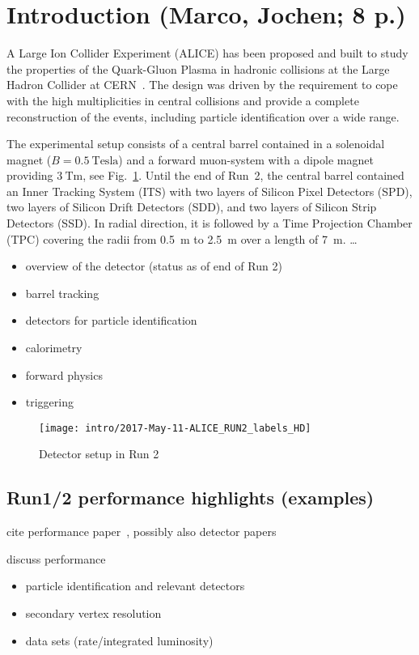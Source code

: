 \section{Introduction (Marco, Jochen; 8 p.)}

A Large Ion Collider Experiment (ALICE) has been proposed and built to study
the properties of the Quark-Gluon Plasma in hadronic collisions at the Large
Hadron Collider at CERN~\cite{Aamodt:2008zz}. The design was driven by the
requirement to cope with the high multiplicities in central \PbPb collisions
and provide a complete reconstruction of the events, including particle
identification over a wide \pt range.

The experimental setup consists of a central barrel contained in a solenoidal
magnet ($B = 0.5~\mathrm{Tesla}$) and a forward muon-system with a dipole magnet
providing $3~\mathrm{Tm}$, see Fig.~\ref{fig:alice_run2}. Until the end of Run~2,
the central barrel contained an Inner Tracking System (ITS) with two layers of
Silicon Pixel Detectors (SPD), two layers of Silicon Drift Detectors (SDD), and
two layers of Silicon Strip Detectors (SSD). In radial direction, it is followed
by a Time Projection Chamber (TPC) covering the radii from 0.5~m to 2.5~m over a
length of 7~m. \dots

\begin{itemize}
\item overview of the detector
  (status as of end of Run 2)
\item barrel tracking
\item detectors for particle identification
\item calorimetry
\item forward physics
\item triggering
\end{itemize}

\begin{figure}
\centering
\texttt{[image: intro/2017-May-11-ALICE\_RUN2\_labels\_HD]}
\caption{Detector setup in Run 2}
\label{fig:alice_run2}
\end{figure}

\subsection*{Run1/2 performance highlights (examples)}

cite performance paper~\cite{Abelev:2014ffa}, possibly also detector papers

discuss performance
\begin{itemize}
\item particle identification and relevant detectors
\item secondary vertex resolution
\item data sets (rate/integrated luminosity)
\end{itemize}

